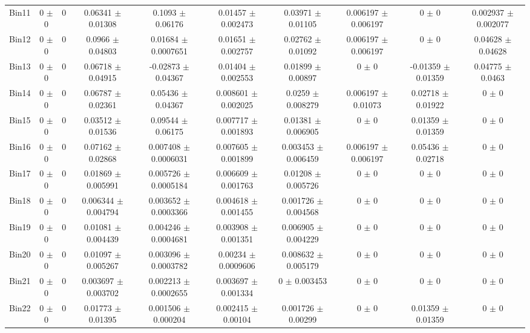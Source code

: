 \begin{tabular}{@{\extracolsep{4pt}}lccccccccc@{}}
     Bin11 & 0 $\pm$ 0 & 0 & 0.06341 $\pm$ 0.01308 & 0.1093 $\pm$ 0.06176 & 0.01457 $\pm$ 0.002473 & 0.03971 $\pm$ 0.01105 & 0.006197 $\pm$ 0.006197 & 0 $\pm$ 0 & 0.002937 $\pm$ 0.002077 \\ 
     Bin12 & 0 $\pm$ 0 & 0 & 0.0966 $\pm$ 0.04803 & 0.01684 $\pm$ 0.0007651 & 0.01651 $\pm$ 0.002757 & 0.02762 $\pm$ 0.01092 & 0.006197 $\pm$ 0.006197 & 0 $\pm$ 0 & 0.04628 $\pm$ 0.04628 \\ 
     Bin13 & 0 $\pm$ 0 & 0 & 0.06718 $\pm$ 0.04915 & -0.02873 $\pm$ 0.04367 & 0.01404 $\pm$ 0.002553 & 0.01899 $\pm$ 0.00897 & 0 $\pm$ 0 & -0.01359 $\pm$ 0.01359 & 0.04775 $\pm$ 0.0463 \\ 
     Bin14 & 0 $\pm$ 0 & 0 & 0.06787 $\pm$ 0.02361 & 0.05436 $\pm$ 0.04367 & 0.008601 $\pm$ 0.002025 & 0.0259 $\pm$ 0.008279 & 0.006197 $\pm$ 0.01073 & 0.02718 $\pm$ 0.01922 & 0 $\pm$ 0 \\ 
     Bin15 & 0 $\pm$ 0 & 0 & 0.03512 $\pm$ 0.01536 & 0.09544 $\pm$ 0.06175 & 0.007717 $\pm$ 0.001893 & 0.01381 $\pm$ 0.006905 & 0 $\pm$ 0 & 0.01359 $\pm$ 0.01359 & 0 $\pm$ 0 \\ 
     Bin16 & 0 $\pm$ 0 & 0 & 0.07162 $\pm$ 0.02868 & 0.007408 $\pm$ 0.0006031 & 0.007605 $\pm$ 0.001899 & 0.003453 $\pm$ 0.006459 & 0.006197 $\pm$ 0.006197 & 0.05436 $\pm$ 0.02718 & 0 $\pm$ 0 \\ 
     Bin17 & 0 $\pm$ 0 & 0 & 0.01869 $\pm$ 0.005991 & 0.005726 $\pm$ 0.0005184 & 0.006609 $\pm$ 0.001763 & 0.01208 $\pm$ 0.005726 & 0 $\pm$ 0 & 0 $\pm$ 0 & 0 $\pm$ 0 \\ 
     Bin18 & 0 $\pm$ 0 & 0 & 0.006344 $\pm$ 0.004794 & 0.003652 $\pm$ 0.0003366 & 0.004618 $\pm$ 0.001455 & 0.001726 $\pm$ 0.004568 & 0 $\pm$ 0 & 0 $\pm$ 0 & 0 $\pm$ 0 \\ 
     Bin19 & 0 $\pm$ 0 & 0 & 0.01081 $\pm$ 0.004439 & 0.004246 $\pm$ 0.0004681 & 0.003908 $\pm$ 0.001351 & 0.006905 $\pm$ 0.004229 & 0 $\pm$ 0 & 0 $\pm$ 0 & 0 $\pm$ 0 \\ 
     Bin20 & 0 $\pm$ 0 & 0 & 0.01097 $\pm$ 0.005267 & 0.003096 $\pm$ 0.0003782 & 0.00234 $\pm$ 0.0009606 & 0.008632 $\pm$ 0.005179 & 0 $\pm$ 0 & 0 $\pm$ 0 & 0 $\pm$ 0 \\ 
     Bin21 & 0 $\pm$ 0 & 0 & 0.003697 $\pm$ 0.003702 & 0.002213 $\pm$ 0.0002655 & 0.003697 $\pm$ 0.001334 & 0 $\pm$ 0.003453 & 0 $\pm$ 0 & 0 $\pm$ 0 & 0 $\pm$ 0 \\ 
     Bin22 & 0 $\pm$ 0 & 0 & 0.01773 $\pm$ 0.01395 & 0.001506 $\pm$ 0.000204 & 0.002415 $\pm$ 0.00104 & 0.001726 $\pm$ 0.00299 & 0 $\pm$ 0 & 0.01359 $\pm$ 0.01359 & 0 $\pm$ 0 \\ 

\end{tabular}
